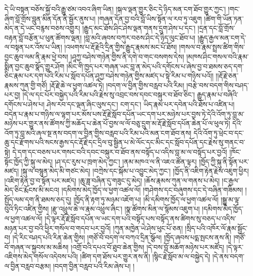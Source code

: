 དེ་ཡི་བསྟན་བཅོས་སྐྱོ་བའི་རྒྱུ་ཙམ་འབའ་ཞིག་ཡིན། །སྐལ་ལྡན་གྱུར་ཅིང་དེ་ཉིད་མན་ངག་ཐོབ་གྱུར་ཀྱང་། །གང་ཞིག་བློ་གྲོས་བླུན་མིན་དོན་ནི་སྦྱོར་ནུས་པ། །གཞན་དོན་བྱ་བའི་བློ་ཡིས་སྟོན་ལ་རབ་ཏུ་འཇུག །ཚིག་གི་ཡོན་ཏན་མེད་ན་དེ་ཡང་བརྙས་བཅས་འགྱུར། །རྒྱུད་མང་ཐོས་ཤིང་ཤེས་ལྡན་གནས་དྲུག་ཤེས་པ་དང་། །དྲན་དང་བློ་གྲོས་བརྟན་བློ་བརྩོན་པ་ཕུན་ཚོགས་ལྡན། །བླ་མའི་ཞབས་བཀུར་བཅས་ཤིང་དེ་ཉིད་ལུང་ཐོབ་པ། །རྒྱུད་རྒྱལ་མན་ངག་དེ་ལ་བསྟན་པར་འོས་པ་ཡིན། །འཕགས་པ་རྡོ་རྗེའི་དྲིན་གྱིས་རྒྱུད་རྣམས་མང་པོ་ཐོས། །གསལ་བ་རྣམ་སྤྲས་ཚིག་གིས་བྱང་ཆུབ་ལམ་ནི་རྣམ་ཕྱེ་བས། །ཤཱཀྱ་བཤེས་གཉེན་གྱིས་ནི་དགེ་བ་གང་བསགས་དེས། །མཁས་ཤིང་གསལ་བའི་རྣམ་སྨིན་བྱང་ཆུབ་སྣོད་གྱུར་ཤོག །མིང་གི་ཁྱད་པར་གཞན་ཡང་བླ་ན་མེད་པའི་དགོངས་པ་ཞེས་བྱ་བ་ཐམས་ཅད་དག་ཅིང་རྣམ་པར་དག་པའི་རིམ་པ་སློབ་དཔོན་ཤཱཀྱ་བཤེས་གཉེན་གྱིས་མཛད་པ་སྟེ་རིམ་པ་གཉིས་པའོ།། །།རྡོ་རྗེ་ཅན་རྣམས་ཀུན་གྱི་གཙོ། །རྡོ་རྗེ་ཆེ་ལ་ཕྱག་འཚལ་ཏེ། །བདག་ལ་བྱིན་གྱིས་བརླབ་པའི་རིམ། །བརྩེ་བས་བདག་གིས་བཤད་པར་བྱ། །དེ་ལ་དང་པོར་བསྐྱེད་པའི་རིམ་པའི་རྗེས་སུ་འབྲང་བས་དབང་བསྐུར་བ་ཐོབ་ཅིང་། རྒྱུད་རྣམ་པ་བཞིའི་དགོངས་པ་ཤེས་པ། ཤེས་རབ་དང་ལྡན་ཞིང་ལུས་དང་། ངག་དང་། ཡིད་རྣམ་པར་དབེན་པའི་ཐོས་པ་འཛིན་པ། བདེན་པ་རྣམ་པ་གཉིས་ལ་ལྷག་པར་མོས་པས་རྡོ་རྗེ་སློབ་དཔོན་ཡང་དག་པར་མཉེས་པར་བྱས་ཏེ་དེའི་འོག་ཏུ་བླ་མ་མཉེས་པར་གྱུར་ནས་ཚོགས་ཀྱི་མཆོད་པ་ཆེན་པོ་བྱས་ལ་ལོ་བཅུ་དྲུག་མ་རྡོ་རྗེ་སློབ་དཔོན་ཆེན་པོ་ལ་ཕུལ་ཏེ། དེའི་འོག་ཏུ་བླ་མའི་ཞལ་སྔ་ནས་བདག་ལ་བྱིན་གྱིས་བརླབ་པའི་རིམ་པའི་མན་ངག་ཐོབ་ནས། དེའི་འོག་ཏུ་ཕྲེང་བ་དང་ཆུ་དང་རྫོགས་པའི་སངས་རྒྱས་དང་རྡོ་རྗེ་དང་དྲིལ་བུ་སྦྱིན་པ་མེ་ལོང་དང་མིང་དང་སློབ་དཔོན་དང་རྗེས་སུ་གནང་བ་སྟེ། དེ་དག་དང་བཅས་པར་གསང་བའི་དབང་བསྐུར་བ་ཐོབ་ནས་བསྟོད་པ་འདིས་བླ་མ་ལ་བསྟོད་པར་བྱའོ། །ཁོང་སྟོང་ཁྱོད་ཀྱི་སྐུ་ལ་མེད། །ཤ་དང་རུས་པ་ཁྲག་མེད་ཀྱང་། །ནམ་མཁའ་ལ་ནི་འཇའ་ཚོན་ལྟར། །ཁྱོད་ཀྱི་སྐུ་ནི་སྟོན་པར་མཛད། །སྐུ་ལ་བསྙུན་མེད་མི་གཙང་མེད། །བཀྲེས་དང་སྐོམ་པ་འབྱུང་མེད་ཀྱང་། །ཁྱོད་ནི་འཇིག་རྟེན་རྗེས་འཇུག་ཕྱིར། །འཇིག་རྟེན་བྱ་བ་སྟོན་པར་མཛད། །ཆུ་ཟླ་བཞིན་དུ་གཟུང་དུ་མེད། །ཆོས་རྣམས་ཀུན་ལ་གནས་པ་མེད། །ང་རྒྱལ་མེད་ཅིང་རྨོངས་མི་མངའ། །དམིགས་མེད་ཁྱོད་ལ་ཕྱག་འཚལ་ལོ། །གཤེགས་དང་བཞུགས་དང་དེ་བཞིན་གཟིམས། །སྤྱོད་ལམ་དག་ནི་ཐམས་ཅད་དུ། །ཁྱོད་ནི་རྟག་ཏུ་མཉམ་འཇོག་པ། །མི་དམིགས་ཁྱོད་ལ་ཕྱག་འཚལ་ལོ། །སྒྱུ་མ་ལྟ་བུའི་ཏིང་འཛིན་གྱིས། །རྫུ་འཕྲུལ་ཆེ་ལ་རྣམ་འཕྲུལ་ཞིང་། །སྣ་ཚོགས་མིན་ལ་སྙོམས་འཇུག་པ། །དམིགས་མེད་ཁྱོད་ལ་ཕྱག་འཚལ་ལོ། །དེ་ལྟར་རྡོ་རྗེ་སློབ་དཔོན་ལ་ཡང་དག་པའི་བསྟོད་པས་བསྟོད་ནས་ཚིགས་སུ་བཅད་པ་འདིས་མཉན་པར་བྱ་བའི་ཕྱིར་གསོལ་བ་གདབ་པར་བྱའོ། །ཀུན་མཁྱེན་ཡེ་ཤེས་ཕུང་པོ་ཅན། །སྲིད་པའི་འཁོར་ལོ་རྣམ་སྦྱོང་བ། །དེ་རིང་བཤད་པའི་རིན་ཆེན་གྱིས། །གཙོ་བོ་བདག་ལ་བཀའ་དྲིན་སྩོལ། །ཁྱོད་ཞབས་པདྨ་སྤངས་ནས་ནི། །གཙོ་བོ་གཞན་ལ་སྐྱབས་མ་མཆིས། །འགྲོ་བའི་དཔའ་བོ་ཐུབ་ཆེན་གྱིས། །དེ་བས་བློ་མཆོག་མཉེས་པར་མཛོད། །དེ་ལྟར་འཇིགས་མེད་གསོལ་འདེབས་པའི། །ཚིག་དག་ཐོས་པར་གྱུར་ནས་ནི། །སྙིང་རྗེ་སློབ་མ་ལ་བསྐྱེད་དེ། །དེ་ནས་བདག་ལ་བྱིན་བརླབ་བརྩམ། །བདག་བྱིན་བརླབ་པའི་རིམ་ཞེས་པ། །
